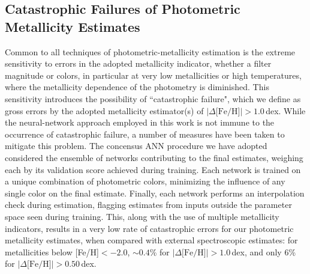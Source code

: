 \documentclass[twocolumn,trackchanges]{aastex63}
\begin{document}




	

\subsection{Catastrophic Failures of Photometric Metallicity Estimates}

Common to all techniques of photometric-metallicity estimation is the extreme sensitivity to errors in the adopted metallicity indicator, whether a  filter magnitude or colors, in particular at very low metallicities or high temperatures, where the metallicity dependence of the photometry is diminished. This sensitivity introduces the possibility of ``catastrophic failure", which we define as gross errors by the adopted metallicity estimator(s) of $|\Delta\textrm{[Fe/H]}| > 1.0$\,dex. While the neural-network approach employed in this work is not immune to the occurrence of catastrophic failure, a number of measures have been taken to mitigate this problem. The concensus ANN procedure we have adopted considered the ensemble of networks contributing to the final estimates, weighing each by its validation score achieved during training. Each network is trained on a unique combination of photometric colors, minimizing the influence of any single color on the final estimate. Finally, each network performs an interpolation check during estimation, flagging estimates from inputs outside the parameter space seen during training. This, along with the use of multiple metallicity indicators, results in a very low rate of catastrophic errors for our photometric metallicity estimates, when compared with external spectroscopic estimates: for metallicities below [Fe/H]$<-2.0$, $\sim 0.4$\% for $| \Delta \textrm{[Fe/H]} | > 1.0$\,dex, and only  6\% for $| \Delta \textrm{[Fe/H]} |  > 0.50$\,dex. 
 
\end{document}
